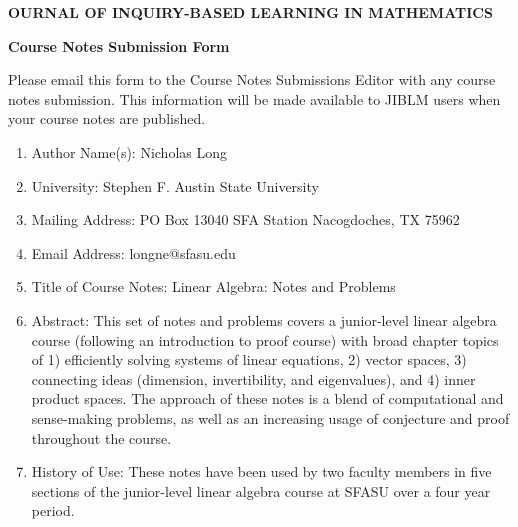 \documentclass[12pt]{article}
\begin{document}
\begin{center}
{\bf {}OURNAL OF {\Large I}NQUIRY-{\Large B}ASED
{\Large L}EARNING
\medskip
\noindent IN {\Large M}ATHEMATICS}
\end{center}

\medskip
\begin{center}
{\large \bf Course Notes Submission Form}
\end{center}

Please email this form to the Course Notes Submissions Editor with any course notes submission. This information will be made available to JIBLM users when your course notes are published.

\begin{enumerate}

\item Author Name(s): Nicholas Long

\item University: Stephen F. Austin State University

\item Mailing Address: PO Box 13040 SFA Station Nacogdoches, TX 75962

\item Email Address: longne@sfasu.edu

\item Title of Course Notes: Linear Algebra: Notes and Problems

\item Abstract: This set of notes and problems covers a junior-level linear algebra course (following an introduction to proof course) with broad chapter topics of 1) efficiently solving systems of linear equations, 2) vector spaces, 3) connecting ideas (dimension, invertibility, and eigenvalues), and 4) inner product spaces. The approach of these notes is a blend of computational and sense-making problems, as well as an increasing usage of conjecture and proof throughout the course.

\item History of Use: These notes have been used by two faculty members in five sections of the junior-level linear algebra course at SFASU over a four year period.
\end{enumerate}
\end{document}
